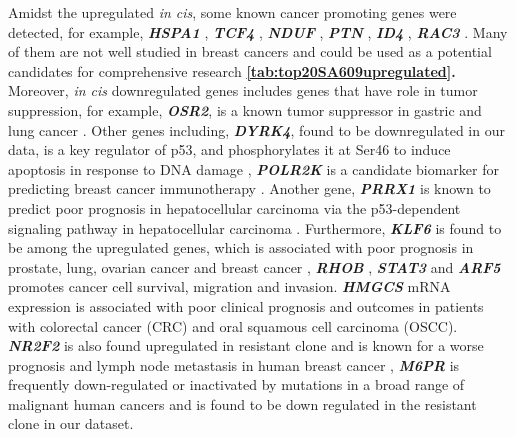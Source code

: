Amidst the upregulated \textit{in cis}, some known cancer promoting genes were detected, for example,  \textit{\textbf{HSPA1}} \cite{zoppino2018comprehensive},  \textit{\textbf{TCF4}} \cite{ravindranath2011wnt}, \textit{\textbf{NDUF}} \cite{li2015down}, 
\textit{\textbf{PTN}} \cite{huang2018chemotherapy},        
\textit{\textbf{ID4}} \cite{donzelli2018expression}, 
\textit{\textbf{RAC3}} \cite{donnelly2017rac3}. Many of them are not well studied in breast cancers and could be used as a potential candidates for comprehensive research \textbf{\autoref{tab:top20SA609upregulated}.}
Moreover, \textit{in cis} downregulated genes includes genes that have role in tumor suppression, for example, \textit{\textbf{OSR2}}, is a known tumor suppressor in gastric and lung cancer \cite{otani2014odd,wang2018odd}. Other genes including, \textit{\textbf{DYRK4}}, found to be downregulated in our data, is a key regulator of p53, and phosphorylates it at Ser46 to induce apoptosis in response to DNA damage \cite{yoshida2019multiple}, \textit{\textbf{POLR2K}} is a candidate biomarker for predicting breast cancer immunotherapy \cite{lopez2020prediction}. Another gene, \textit{\textbf{PRRX1}} is known to predict poor prognosis in hepatocellular carcinoma via the p53-dependent signaling pathway in hepatocellular carcinoma \cite{fan2017downregulation}. Furthermore,  
\textit{\textbf{KLF6}} is found to be among the upregulated genes, which is associated with poor prognosis in prostate, lung, ovarian cancer and 
breast cancer \cite{hatami2013klf6,difeo2009role}, 
\textit{\textit{\textbf{RHOB}}} \cite{ju2018rhob},
\textit{\textbf{STAT3}} \cite{li2019clinicopathological,kamran2013role} and 
\textit{\textbf{ARF5}} \cite{li2017roles,casalou2020role} promotes cancer cell survival, migration and invasion. \textit{\textbf{HMGCS}} \cite{chen2017hmgcs2} mRNA expression is associated with poor clinical prognosis and outcomes in patients with colorectal cancer (CRC) and oral squamous cell carcinoma (OSCC). \textit{\textbf{NR2F2}} is also found upregulated in resistant clone and is known for a worse prognosis and lymph node metastasis in human breast cancer 
\cite{erdHos2020nr2f2,xia2020nr2f2},
 \textit{\textbf{M6PR}} is frequently down-regulated or inactivated by mutations in a broad range of malignant human cancers \cite{dalle2018mannose} and is found to be down regulated in the resistant clone in our dataset. 

